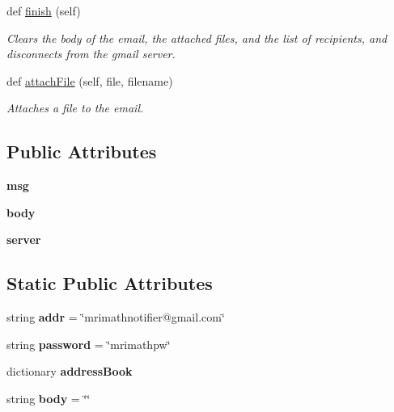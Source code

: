 \begin{DoxyCompactItemize}
def \mbox{\hyperlink{classEmailHandler_1_1EmailHandler_a66b5b3161b6b60f049e8163fbe2e3f59}{finish}} (self)
\begin{DoxyCompactList}\small\item\em Clears the body of the email, the attached files, and the list of recipients, and disconnects from the gmail server. \end{DoxyCompactList}\item 
def \mbox{\hyperlink{classEmailHandler_1_1EmailHandler_aeafa5d9ec69ed3459fb5f95804081b30}{attach\+File}} (self, file, filename)
\begin{DoxyCompactList}\small\item\em Attaches a file to the email. \end{DoxyCompactList}\end{DoxyCompactItemize}
\subsection*{Public Attributes}
\begin{DoxyCompactItemize}
\item 
\mbox{\label{classEmailHandler_1_1EmailHandler_a5f0428b1c117715c2d922f49396a932c}} 
{\bfseries msg}
\item 
\mbox{\label{classEmailHandler_1_1EmailHandler_a5754da0cd979038628031da0ebecc40a}} 
{\bfseries body}
\item 
\mbox{\label{classEmailHandler_1_1EmailHandler_aadf372340aeaa718ace3de18837a40f6}} 
{\bfseries server}
\end{DoxyCompactItemize}
\subsection*{Static Public Attributes}
\begin{DoxyCompactItemize}
\item 
\mbox{\label{classEmailHandler_1_1EmailHandler_ae097564e29120a27af23b6a238b4e8dd}} 
string {\bfseries addr} = \char`\"{}mrimathnotifier@gmail.\+com\char`\"{}
\item 
\mbox{\label{classEmailHandler_1_1EmailHandler_a30ef821e52a96c66887c623ea3b5fe13}} 
string {\bfseries password} = \char`\"{}mrimathpw\char`\"{}
\item 
dictionary {\bfseries address\+Book}
\item 
\mbox{\label{classEmailHandler_1_1EmailHandler_a96497debc081553d1ee839fa89718db1}} 
string {\bfseries body} = \char`\"{}\char`\"{}
\end{DoxyCompactItemize}


